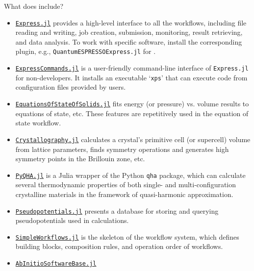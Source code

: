 \begin{frame}[allowframebreaks]{What does \express{} include?}
    \begin{itemize}
        \item \href{https://github.com/MineralsCloud/Express.jl}{\texttt{Express.jl}}
              provides a high-level interface to all the
              workflows, including file reading and writing, job
              creation, submission, monitoring, result retrieving, and data
              analysis. To work with specific software, install the corresponding plugin,
              e.g., \texttt{QuantumESPRESSOExpress.jl} for \qe.
        \item \href{https://github.com/MineralsCloud/ExpressCommands.jl}{\texttt{ExpressCommands.jl}}
              is a user-friendly command-line interface of
              \texttt{Express.jl} for non-developers. It installs an executable
              `\texttt{xps}' that can execute code from configuration files provided by users.
        \item \href{https://github.com/MineralsCloud/EquationsOfStateOfSolids.jl}{\texttt{EquationsOfStateOfSolids.jl}}
              fits energy (or pressure) vs. volume results to equations of state,
              etc. These features are repetitively used in the equation of state workflow.
        \item \href{https://github.com/MineralsCloud/Crystallography.jl}{\texttt{Crystallography.jl}}
              calculates a crystal's primitive cell (or supercell) volume from lattice parameters, finds symmetry
              operations and generates high symmetry points in the Brillouin zone, etc.
        \item \href{https://github.com/MineralsCloud/PyQHA.jl}{\texttt{PyQHA.jl}}
              is a Julia wrapper of
              the Python \texttt{qha} package, which can calculate
              several thermodynamic properties of both single- and multi-configuration
              crystalline materials in the framework of quasi-harmonic approximation.
        \item \href{https://github.com/MineralsCloud/Pseudopotentials.jl}{\texttt{Pseudopotentials.jl}} presents
              a database for storing and querying pseudopotentials used in \ab{} calculations.
        \item \href{https://github.com/MineralsCloud/SimpleWorkflows.jl}{\texttt{SimpleWorkflows.jl}}
              is the skeleton of the workflow system, which
              defines building blocks, composition rules, and operation order of workflows.
        \item \href{https://github.com/MineralsCloud/AbInitioSoftwareBase.jl}{\texttt{AbInitio\-Software\-Base.jl}}

\end{itemize}
\end{frame}
